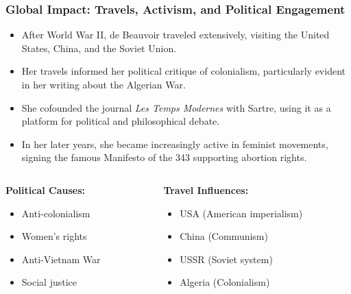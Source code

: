 \documentclass[aspectratio=169]{beamer}
\begin{document}
	
	\begin{frame}
		\frametitle{Global Impact: Travels, Activism, and Political Engagement}
		\begin{itemize}
			\item After World War II, de Beauvoir traveled extensively, visiting the United States, China, and the Soviet Union.
			\item Her travels informed her political critique of colonialism, particularly evident in her writing about the Algerian War.
			\item She cofounded the journal \textit{Les Temps Modernes} with Sartre, using it as a platform for political and philosophical debate.
			\item In her later years, she became increasingly active in feminist movements, signing the famous Manifesto of the 343 supporting abortion rights.
		\end{itemize}
		
		\begin{columns}
			\begin{column}{0.5\textwidth}
				\textbf{Political Causes:}
				\begin{itemize}
					\item Anti-colonialism
					\item Women's rights
					\item Anti-Vietnam War
					\item Social justice
				\end{itemize}
			\end{column}
			\begin{column}{0.5\textwidth}
				\textbf{Travel Influences:}
				\begin{itemize}
					\item USA (American imperialism)
					\item China (Communism)
					\item USSR (Soviet system)
					\item Algeria (Colonialism)
				\end{itemize}
			\end{column}
		\end{columns}
	\end{frame}
	
\end{document}
